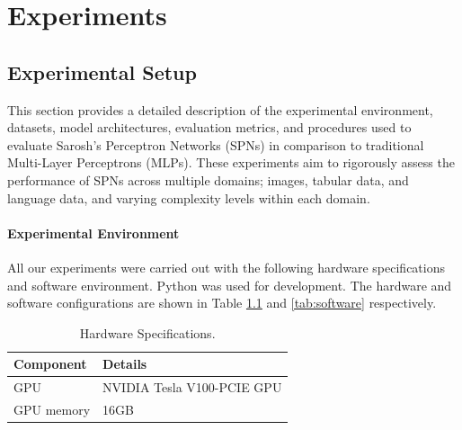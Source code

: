 
\chapter{Experiments} %

\label{Experiments} %


\section{Experimental Setup}

This section provides a detailed description of the experimental environment, datasets, model architectures, evaluation metrics, and procedures used to evaluate Sarosh’s Perceptron Networks (SPNs) in comparison to traditional Multi-Layer Perceptrons (MLPs). These experiments aim to rigorously assess the performance of SPNs across multiple domains; images, tabular data, and language data, and varying complexity levels within each domain.
\subsubsection{Experimental Environment}
All our experiments were carried out with the following hardware specifications and software environment. Python was used for development. The hardware and software configurations are shown in Table \ref{tab:hardware} and \ref{tab:software} respectively.

\begin{table}[h!]
\centering
\caption{Hardware Specifications.}
\label{tab:hardware}
\begin{tabular}{| m{4cm} | m{6cm} |}
\hline
\textbf{Component} & \textbf{Details} \\
\hline
GPU & NVIDIA Tesla V100-PCIE GPU \\
GPU memory & 16GB \\
\hline
\end{tabular}
\end{table}

